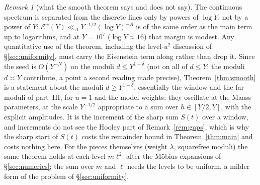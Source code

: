 \documentclass[11pt,a4paper]{article}
\theoremstyle{remark}\newtheorem{remark}[theorem]{Remark}
\begin{document}
\begin{remark}[what the smooth theorem says and does not say]\label{rem:smoothmeaning}
The continuous spectrum is separated from the discrete lines only by powers of $\log Y$, not by a power of $Y$:
$\mathcal E^w(Y)\ll_AY^{-1/2}(\log Y)^{-A}$ is of the same order as the main term up to logarithms, and at $Y=10^7$
($\log Y\approx16$) that margin is modest. Any quantitative use of the theorem, including the level-$u^2$ discussion of
\S\ref{sec:uniformity}, must carry the Eisenstein term along rather than drop it.
Since the seed is $O(Y^{-N})$ on the moduli $d\le Y^{1-\delta}$ (not on all of $d\le Y$: the moduli $d\asymp Y$ contribute, a
point a second reading made precise), Theorem~\ref{thm:smooth} is a statement about the moduli $d\ge Y^{1-\delta}$, essentially
the window and the far moduli of part~III, for $u=1$ and the model weights: they oscillate at the Maass parameters, at the scale
$Y^{-1/2}$ appropriate to a sum over $h\in[Y/2,Y]$, with the explicit amplitudes. It is the increment of the sharp sum
$S(t)$ over a window, and increments do not see the Hooley part of Remark~\ref{rem:gaps}, which is why the sharp start
of $S(t)$ costs the remainder bound in Theorem~\ref{thm:main} and costs nothing here. For the pieces themselves (weight
$\lambda$, squarefree moduli) the same theorem holds at each level $m\ell^2$ after the M\"obius expansions of
\S\ref{sec:numerics}; the sum over $m$ and $\ell$ needs the levels to be uniform, a milder form of the problem of
\S\ref{sec:uniformity}.
\end{remark}
\end{document}
